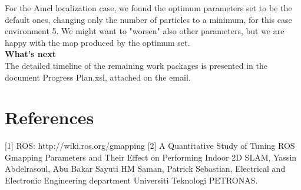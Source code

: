 \documentclass[11pt,a4paper]{article}
\begin{document}
For the Amcl localization case, we found the optimum parameters set to be the default ones, changing only the number of particles to a minimum, for this case environment 5. We might want to "worsen" also other parameters, but we are happy with the map produced by the optimum set. \\
\textbf{What's next} \\
The detailed timeline of the remaining work packages is presented in the document Progress  Plan.xsl, attached on the email.
\section{References} \label{ref}

[1] ROS: http://wiki.ros.org/gmapping 
[2] A Quantitative Study of Tuning ROS Gmapping Parameters and Their Effect on Performing Indoor 2D SLAM, Yassin Abdelrasoul, Abu Bakar Sayuti HM Saman, Patrick Sebastian, Electrical and Electronic Engineering department Universiti Teknologi PETRONAS.
\end{document}
